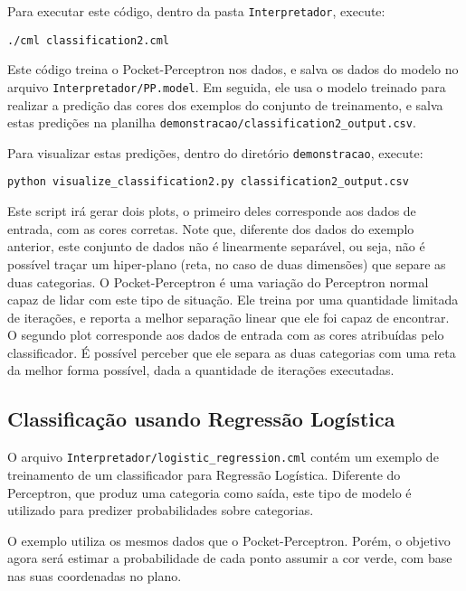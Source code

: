 \documentclass[12pt]{article}
\begin{document}
Para executar este código, dentro da pasta \texttt{Interpretador}, execute:

\begin{verbatim}
./cml classification2.cml
\end{verbatim}

Este código treina o Pocket-Perceptron nos dados, e salva os dados do modelo no arquivo \texttt{Interpretador/PP.model}. Em seguida, ele usa o modelo treinado para realizar a predição das cores dos exemplos do conjunto de treinamento, e salva estas predições na planilha \texttt{demonstracao/classification2\_output.csv}.

Para visualizar estas predições, dentro do diretório \texttt{demonstracao}, execute:

\begin{verbatim}
python visualize_classification2.py classification2_output.csv
\end{verbatim}

Este script irá gerar dois plots, o primeiro deles corresponde aos dados de entrada, com as cores corretas. Note que, diferente dos dados do exemplo anterior, este conjunto de dados não é linearmente separável, ou seja, não é possível traçar um hiper-plano (reta, no caso de duas dimensões) que separe as duas categorias. O Pocket-Perceptron é uma variação do Perceptron normal capaz de lidar com este tipo de situação. Ele treina por uma quantidade limitada de iterações, e reporta a melhor separação linear que ele foi capaz de encontrar. O segundo plot corresponde aos dados de entrada com as cores atribuídas pelo classificador. É possível perceber que ele separa as duas categorias com uma reta da melhor forma possível, dada a quantidade de iterações executadas.

\subsection{Classificação usando Regressão Logística}

O arquivo \texttt{Interpretador/logistic\_regression.cml} contém um exemplo de treinamento de um classificador para Regressão Logística. Diferente do Perceptron, que produz uma categoria como saída, este tipo de modelo é utilizado para predizer probabilidades sobre categorias.

O exemplo utiliza os mesmos dados que o Pocket-Perceptron. Porém, o objetivo agora será estimar a probabilidade de cada ponto assumir a cor verde, com base nas suas coordenadas no plano.
\end{document}
